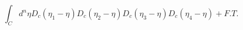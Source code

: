 \begin{equation}
\int_Cd^n\eta 
D_c(\eta_1 - \eta)D_c(\eta_2 - \eta)D_c(\eta_3 - \eta)D_c(\eta_4 - \eta) + F. T.
\end{equation}

